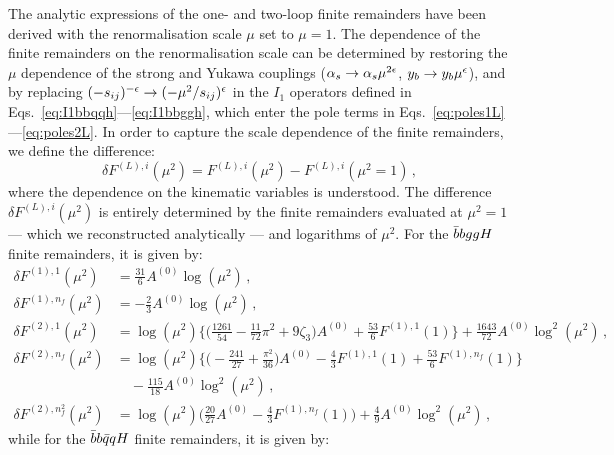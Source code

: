 \documentclass[main.tex]{subfiles}
\begin{document}
The analytic expressions of the one- and two-loop finite remainders have been derived with the renormalisation scale $\mu$ set to $\mu  = 1$. 
The dependence of the finite remainders on the renormalisation scale can be determined by restoring the $\mu$ dependence of the strong and Yukawa couplings ($\alpha_s \rightarrow \alpha_s \mu^{2\epsilon}$, 
$y_b \rightarrow y_b \mu^{\epsilon}$), and by replacing $(-s_{ij})^{-\epsilon} \rightarrow (-\mu^2/s_{ij})^\epsilon$ in the $I_1$ operators defined in Eqs.~\ref{eq:I1bbqqh}---\ref{eq:I1bbggh}, which enter the pole terms in Eqs.~\ref{eq:poles1L}---\ref{eq:poles2L}. In order to capture the scale dependence of the finite remainders, we define the difference:
\begin{equation}
\delta F^{(L),i}(\mu^2) = F^{(L),i}(\mu^2) - F^{(L),i}(\mu^2 = 1) \,,
\end{equation}
where the dependence on the kinematic variables is understood.
The difference $\delta F^{(L),i}(\mu^2)$ is entirely determined by the finite remainders evaluated at $\mu^2=1$ --- which we reconstructed analytically --- and logarithms of $\mu^2$.
For the $\bar{b}bggH$ finite remainders, it is given by:
\begingroup
\allowdisplaybreaks
\begin{align}
\delta F^{(1),1}(\mu^2)   & = \frac{31}{6} A^{(0)} \log(\mu^2) \,, \\
\delta F^{(1),n_f}(\mu^2) & = - \frac{2}{3} A^{(0)} \log(\mu^2) \,, \\
\delta F^{(2),1}(\mu^2) & = \log(\mu^2) \bigg\lbrace \bigg(\frac{1261}{54} - \frac{11}{72}\pi^2 + 9 \zeta_3\bigg) A^{(0)} + \frac{53}{6}F^{(1),1}(1) \bigg\rbrace
                             + \frac{1643}{72} A^{(0)} \log^2(\mu^2) \,, \\
\delta F^{(2),n_f}(\mu^2) & = \log(\mu^2) \bigg\lbrace \bigg(-\frac{241}{27} + \frac{\pi^2}{36} \bigg) A^{(0)} 
                                                                 - \frac{4}{3}F^{(1),1}(1)  + \frac{53}{6}F^{(1),n_f}(1) \bigg\rbrace \nonumber \\
                            & \quad - \frac{115}{18} A^{(0)} \log^2(\mu^2)  \,, \\
\delta F^{(2),n_f^2}(\mu^2) & = \log(\mu^2)\bigg(\frac{20}{27} A^{(0)} - \frac{4}{3} F^{(1),n_f}(1)\bigg) + \frac{4}{9} A^{(0)} \log^2(\mu^2) \,, 
\end{align}
\endgroup
while for the $\bar{b}b\bar{q}qH$ finite remainders, it is given by:
\begingroup
\allowdisplaybreaks
\end{document}
